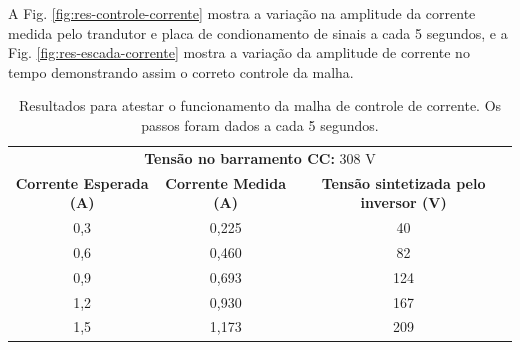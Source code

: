 A Fig. \ref{fig:res-controle-corrente} mostra a variação na amplitude da corrente medida pelo trandutor e placa de condionamento de sinais a cada 5 segundos, 
e a Fig. \ref{fig:res-escada-corrente} mostra a variação da amplitude de corrente no tempo demonstrando assim o correto controle da malha.

\begin{table}[h]
	\centering
	\caption{Resultados para atestar o funcionamento da malha de controle de corrente. Os passos foram dados a cada 5 segundos.}
	\label{tab:res-controle-corrente}
	
	\begin{tabular}{ccc}
		\toprule
		\multicolumn{3}{c}{\textbf{Tensão no barramento CC:} 308 V} \\
		\textbf{Corrente Esperada (A)} & \textbf{Corrente Medida (A)} & \textbf{Tensão sintetizada pelo inversor (V)}\\
		\midrule
		0,3 & 0,225 & 40 \\
		0,6 & 0,460 & 82 \\
		0,9 & 0,693 & 124 \\
		1,2 & 0,930 & 167 \\
		1,5 & 1,173 & 209 \\
		\bottomrule
	\end{tabular}
\end{table}

